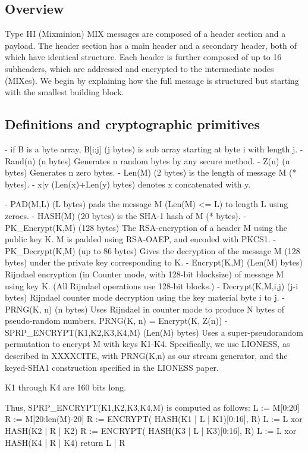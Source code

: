 \subsection{Overview}

Type III (Mixminion) MIX messages are composed of a header section and a
payload.  The header section has a main header and a
secondary header, both of which have identical structure.  Each
header is further composed of up to 16 subheaders, which are
addressed and encrypted to the intermediate nodes (MIXes).  We
begin by explaining how the full message is structured but starting
with the smallest building block.

\subsection{Definitions and cryptographic primitives}

- if B is a byte array, B[i:j] (j bytes) is sub array starting at 
  byte i with length j.
- Rand(n) (n bytes) Generates n random bytes by any secure method.
- Z(n) (n bytes) Generates n zero bytes.
- Len(M) (2 bytes) is the length of message M (* bytes).
- x|y (Len(x)+Len(y) bytes) denotes x concatenated with y.

- PAD(M,L) (L bytes) pads the message M (Len(M) <= L) to length L
  using zeroes.
- HASH(M) (20 bytes) is the SHA-1 hash of M (* bytes).
- PK_Encrypt(K,M) (128 bytes) The RSA-encryption of a header M 
  using the public key K.  M is padded using RSA-OAEP, and encoded
  with PKCS1.
- PK_Decrypt(K,M) (up to 86 bytes) Gives the decryption of the
  message M (128 bytes) under the private key corresponding to K.
- Encrypt(K,M) (Len(M) bytes) Rijndael encryption (in Counter mode,
  with 128-bit blocksize) of message M using key K.  (All Rijndael
  operations use 128-bit blocks.)
- Decrypt(K,M,i,j) (j-i bytes) Rijndael counter mode decryption 
  using the key material byte i to j.
- PRNG(K, n) (n bytes) Uses Rijndael in counter mode to produce N
  bytes of pseudo-random numbers.
  PRNG(K, n) = Encrypt(K, Z(n))
- SPRP_ENCRYPT(K1,K2,K3,K4,M) (Len(M) bytes) Uses a super-pseudorandom
  permutation to encrypt M with keys K1-K4.  Specifically, we use LIONESS,
  as described in XXXXCITE, with PRNG(K,n) as our stream generator,
  and the keyed-SHA1 construction specified in the LIONESS paper.

  K1 through K4 are 160 bits long.

  Thus, SPRP_ENCRYPT(K1,K2,K3,K4,M) is computed as follows:
            L := M[0:20]
            R := M[20:len(M)-20]
            R := ENCRYPT( HASH(K1 | L | K1)[0:16], R)
            L := L xor HASH(K2 | R | K2)
            R := ENCRYPT( HASH(K3 | L | K3)[0:16], R)
            L := L xor HASH(K4 | R | K4) 
            return L | R

